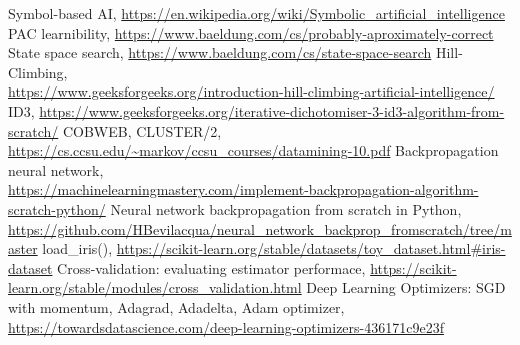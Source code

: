 \documentclass[fontsize=11bp, paper=a4]{scrarticle}
\begin{document}


\newpage

\begin{thebibliography}{1}
    Symbol-based AI, \url{https://en.wikipedia.org/wiki/Symbolic_artificial_intelligence}
    PAC learnibility, \url{https://www.baeldung.com/cs/probably-aproximately-correct}
    State space search, \url{https://www.baeldung.com/cs/state-space-search}
    Hill-Climbing, \\
    \url{https://www.geeksforgeeks.org/introduction-hill-climbing-artificial-intelligence/}
    ID3, \url{https://www.geeksforgeeks.org/iterative-dichotomiser-3-id3-algorithm-from-scratch/}
    COBWEB, CLUSTER/2, \url{https://cs.ccsu.edu/~markov/ccsu_courses/datamining-10.pdf}
    Backpropagation neural network, \\
    \url{https://machinelearningmastery.com/implement-backpropagation-algorithm-scratch-python/}
    Neural network backpropagation from scratch in Python, \url{https://github.com/HBevilacqua/neural_network_backprop_fromscratch/tree/master}
    load\_iris(), \url{https://scikit-learn.org/stable/datasets/toy_dataset.html#iris-dataset}
    Cross-validation: evaluating estimator performace, \url{https://scikit-learn.org/stable/modules/cross_validation.html}
    Deep Learning Optimizers: SGD with momentum, Adagrad, Adadelta, Adam optimizer, \url{https://towardsdatascience.com/deep-learning-optimizers-436171c9e23f}
\end{thebibliography}






\end{document}
